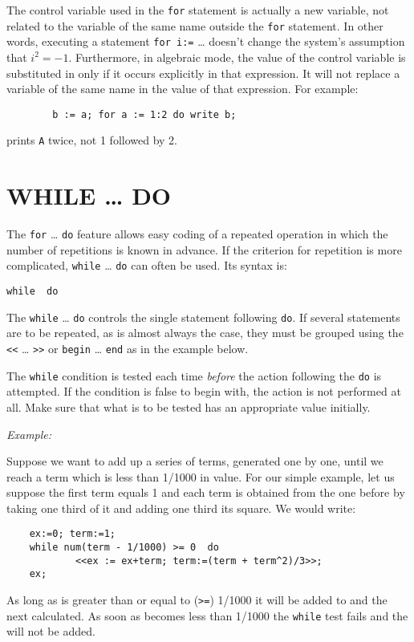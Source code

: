 The control variable used in the \texttt{for} statement is actually a new
variable, not related to the variable of the same name outside the
\texttt{for} statement.  In other words, executing a statement
\texttt{for i:=} \ldots
doesn't change the system's assumption that $i^{2} = -1$.
Furthermore, in algebraic mode, the value of the control variable is
substituted in  only if it occurs explicitly in that
expression.  It will not replace a variable of the same name in the value
of that expression.  For example:
\begin{verbatim}
        b := a; for a := 1:2 do write b;
\end{verbatim}
prints \texttt{A} twice, not 1 followed by 2.

\section{WHILE \ldots{} DO}
\hypertarget{command:WHILE}{}

The \texttt{for} \ldots{} \texttt{do} feature
allows easy coding of a repeated operation in which the number of repetitions
is known in advance.  If the criterion for repetition is more complicated,
\texttt{while} \ldots{} \texttt{do} can often be used.  Its syntax is:
\begin{syntax}
  \texttt{while }\texttt{ do }
\end{syntax}
The \texttt{while} \ldots{} \texttt{do} controls the single statement
following \texttt{do}.
If several statements are to be repeated, as is almost always the case,
they must be grouped using the \texttt{<}\texttt{<} \ldots{} \texttt{>}\texttt{>}
or \texttt{begin} \ldots{} \texttt{end}
as in the example below.

The \texttt{while} condition is tested each time \emph{before} the action
following the \texttt{do} is attempted.  If the condition is false to begin
with, the action is not performed at all.  Make sure that what is to be
tested has an appropriate value initially.

\textit{Example:}

Suppose we want to add up a series of terms, generated one by one, until
we reach a term which is less than 1/1000 in value.  For our simple
example, let us suppose the first term equals 1 and each term is obtained
from the one before by taking one third of it and adding one third its
square. We would write:
\begin{verbatim}
    ex:=0; term:=1;
    while num(term - 1/1000) >= 0  do
            <<ex := ex+term; term:=(term + term^2)/3>>;
    ex;
\end{verbatim}
As long as  is greater than or equal to (\texttt{>=}) 1/1000 it will
be added to  and the next  calculated.  As soon as
 becomes less than 1/1000 the \texttt{while} test fails and the
 will not be added.


